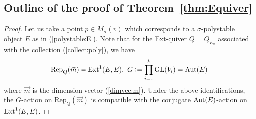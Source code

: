 \documentclass[11pt]{amsart}
\theoremstyle{plain}
\theoremstyle{definition}
\theoremstyle{remark}
\newcommand{\Ext}{\mathop{\rm Ext}\nolimits}
\newcommand{\Aut}{\mathop{\rm Aut}\nolimits}
\newcommand{\GL}{\mathop{\rm GL}\nolimits}
\begin{document}
\subsection{Outline of the proof of Theorem~\ref{thm:Equiver}}
\label{subsec:outline}
\begin{proof}
Let us take a point $p \in M_{\sigma}(v)$ 
which corresponds to 
a $\sigma$-polystable object $E$ as in 
(\ref{polystable:E}). 
Note that for the Ext-quiver
$Q=Q_{E_{\bullet}}$
associated with the collection (\ref{collect:poly}), we have 
\begin{align*}
\mathrm{Rep}_Q(\vec{m})=\Ext^1(E, E), \ 
G \cneq \prod_{i=1}^k \GL(V_i)=\Aut(E)
\end{align*}
where $\vec{m}$ is the dimension vector (\ref{dimvec:m}). 
Under the above identifications, the 
$G$-action on $\mathrm{Rep}_Q(\vec{m})$ is compatible 
with the conjugate $\Aut(E)$-action on $\Ext^1(E, E)$. 


\end{proof}
\end{document}
